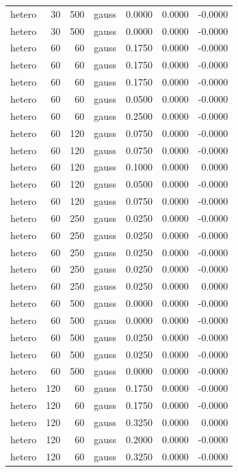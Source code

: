 \begin{tabular}{lrrlrrr}
hetero & 30 & 500 & gauss & 0.0000 & 0.0000 & -0.0000 \\
hetero & 30 & 500 & gauss & 0.0000 & 0.0000 & -0.0000 \\
hetero & 60 & 60 & gauss & 0.1750 & 0.0000 & -0.0000 \\
hetero & 60 & 60 & gauss & 0.1750 & 0.0000 & -0.0000 \\
hetero & 60 & 60 & gauss & 0.1750 & 0.0000 & -0.0000 \\
hetero & 60 & 60 & gauss & 0.0500 & 0.0000 & -0.0000 \\
hetero & 60 & 60 & gauss & 0.2500 & 0.0000 & -0.0000 \\
hetero & 60 & 120 & gauss & 0.0750 & 0.0000 & -0.0000 \\
hetero & 60 & 120 & gauss & 0.0750 & 0.0000 & -0.0000 \\
hetero & 60 & 120 & gauss & 0.1000 & 0.0000 & 0.0000 \\
hetero & 60 & 120 & gauss & 0.0500 & 0.0000 & -0.0000 \\
hetero & 60 & 120 & gauss & 0.0750 & 0.0000 & -0.0000 \\
hetero & 60 & 250 & gauss & 0.0250 & 0.0000 & -0.0000 \\
hetero & 60 & 250 & gauss & 0.0250 & 0.0000 & -0.0000 \\
hetero & 60 & 250 & gauss & 0.0250 & 0.0000 & -0.0000 \\
hetero & 60 & 250 & gauss & 0.0250 & 0.0000 & -0.0000 \\
hetero & 60 & 250 & gauss & 0.0250 & 0.0000 & 0.0000 \\
hetero & 60 & 500 & gauss & 0.0000 & 0.0000 & -0.0000 \\
hetero & 60 & 500 & gauss & 0.0000 & 0.0000 & -0.0000 \\
hetero & 60 & 500 & gauss & 0.0250 & 0.0000 & -0.0000 \\
hetero & 60 & 500 & gauss & 0.0250 & 0.0000 & -0.0000 \\
hetero & 60 & 500 & gauss & 0.0000 & 0.0000 & -0.0000 \\
hetero & 120 & 60 & gauss & 0.1750 & 0.0000 & -0.0000 \\
hetero & 120 & 60 & gauss & 0.1750 & 0.0000 & -0.0000 \\
hetero & 120 & 60 & gauss & 0.3250 & 0.0000 & 0.0000 \\
hetero & 120 & 60 & gauss & 0.2000 & 0.0000 & -0.0000 \\
hetero & 120 & 60 & gauss & 0.3250 & 0.0000 & -0.0000 \\

\end{tabular}
